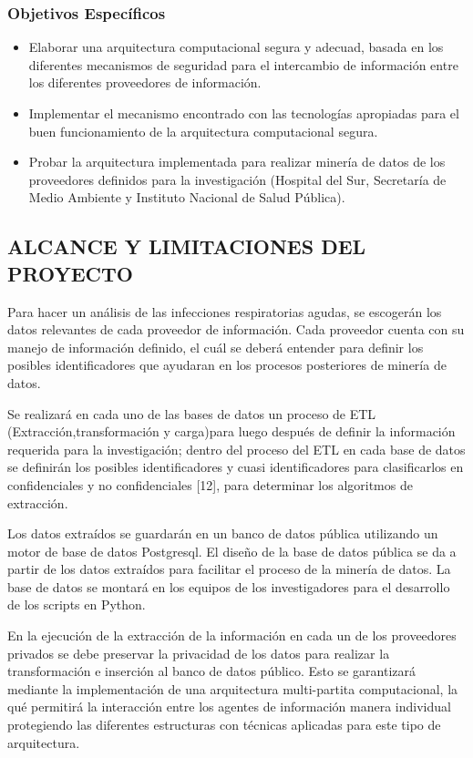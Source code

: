 \documentclass[a4paper, 11pt, oneside]{article}
\theoremstyle{definition}
\theoremstyle{remark}
\begin{document}
\subsubsection{Objetivos Específicos}
\begin{itemize}
\item Elaborar una arquitectura computacional segura y adecuad, basada en los diferentes mecanismos de seguridad para el intercambio de información entre los diferentes proveedores de información.
\item Implementar el mecanismo encontrado con las tecnologías apropiadas para el buen funcionamiento de la arquitectura computacional segura.
\item Probar la arquitectura implementada para realizar minería de datos de los proveedores definidos para la investigación (Hospital del Sur, Secretaría de Medio Ambiente y Instituto Nacional de Salud Pública).

\end{itemize}

\subsection{ALCANCE Y LIMITACIONES DEL PROYECTO}

Para hacer un análisis de las infecciones respiratorias agudas, se escogerán los datos relevantes de cada proveedor de información. Cada proveedor cuenta con su  manejo de información definido, el cuál se deberá entender para definir los posibles identificadores que ayudaran en los procesos posteriores de minería de datos. 

Se realizará en cada uno de las bases de datos un proceso de ETL (Extracción,transformación y carga)para luego después de definir la información requerida para la investigación; dentro del proceso del ETL en cada base de datos se definirán los posibles identificadores y cuasi identificadores para clasificarlos en confidenciales y no confidenciales [12], para determinar los algoritmos de extracción.

Los datos extraídos se guardarán en un banco de datos pública utilizando un motor de base de datos Postgresql. El diseño de la base de datos pública se da a partir de los datos extraídos para facilitar el proceso de la minería de datos. La base de datos se montará en los equipos de los  investigadores para el desarrollo de los scripts en Python.

En la ejecución de la extracción de la información en cada un de los proveedores privados se debe preservar la privacidad de los datos para realizar la transformación e inserción al banco de datos público. Esto se garantizará mediante la implementación de una arquitectura multi-partita computacional, la qué permitirá la interacción entre los agentes de información manera individual protegiendo las diferentes estructuras con técnicas aplicadas para este tipo de arquitectura.
\end{document}
